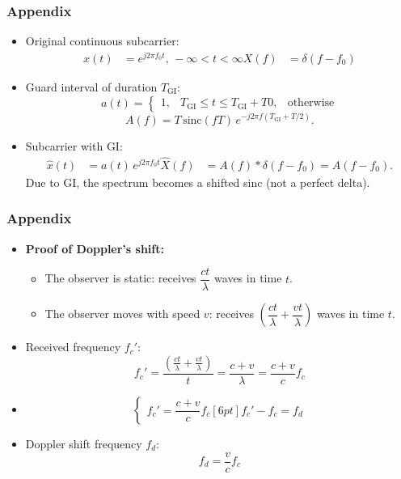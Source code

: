 \documentclass[xcolor=dvipsnames,aspectratio=169]{beamer} %
\def\\{}%
\begin{document}
\begin{frame}
    \frametitle{Appendix}
    \begin{itemize}
    \item Original continuous subcarrier:
    \begin{align*}
        x(t) &= e^{j 2\pi f_0 t},\, -\infty < t < \infty \\
        X(f) &= \delta(f - f_0)
    \end{align*}
    \item Guard interval of duration $T_{\mathrm{GI}}$:
    \[
        a(t) = 
        \begin{cases}
            1, & T_{\mathrm{GI}} \le t \le T_{\mathrm{GI}}+T \\
            0, & \text{otherwise}
        \end{cases}
    \]
    \[
        A(f) = T \, \mathrm{sinc}(fT)\, e^{-j2\pi f (T_{\mathrm{GI}} + T/2)}.
    \]
    \item Subcarrier with GI:
    \begin{align*} 
        \hat{x}(t) &= a(t)\,e^{j2\pi f_0 t} \\
        \hat{X}(f) &= A(f) * \delta(f-f_0) = A(f-f_0).
    \end{align*}
    Due to GI, the spectrum becomes a shifted sinc (not a perfect delta).
\end{itemize}
\end{frame}
\begin{frame}
    \frametitle{Appendix}
    \begin{itemize}
        \item \textbf{Proof of Doppler's shift:}
        \begin{itemize}
            \item The observer is static: receives $\dfrac{ct}{\lambda}$ waves in time $t$.
            \item The observer moves with speed $v$: receives $\left(\dfrac{ct}{\lambda} + \dfrac{vt}{\lambda}\right)$ waves in time $t$.
        \end{itemize}
        \item Received frequency $f_c'$:
        \[
            f_c' = \frac{\left(\frac{ct}{\lambda} + \frac{vt}{\lambda}\right)}{t} = \frac{c+v}{\lambda} = \frac{c+v}{c} f_c
        \]
        \item
        \[
            \begin{cases}
            f_c' = \dfrac{c+v}{c} f_c \\[6pt]
            f_c' - f_c = f_d
            \end{cases}
        \]
        \item Doppler shift frequency $f_d$:
        \[
            f_d = \frac{v}{c} f_c
        \]
    \end{itemize}
\end{frame}
\end{document}
